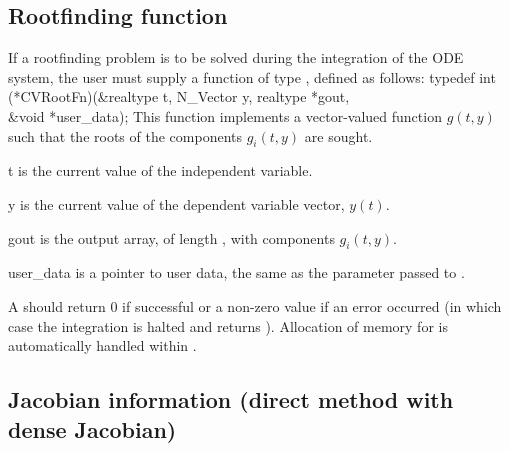 \subsection{Rootfinding function}\label{ss:rootFn}
If a rootfinding problem is to be solved during the integration of the ODE system,
the user must supply a {\CC} function of type , defined as follows:
{
  typedef int (*CVRootFn)(&realtype t, N\_Vector y, realtype *gout, \\
                          &void *user\_data);
}
{
  This function implements a vector-valued function $g(t,y)$ such that the roots of 
  the  components $g_i(t,y)$ are sought.
}
{
  \begin{args}
  \item[t]
    is the current value of the independent variable.
  \item[y]
    is the current value of the dependent variable vector, $y(t)$.
  \item[gout]
    is the output array, of length , with components $g_i(t,y)$.
  \item[user\_data]
    is a pointer to user data, the same as the       
    parameter passed to .   
  \end{args}
}
{
  A  should return 0 if successful or a non-zero value if
  an error occurred (in which case the integration is halted and  returns
  ).
}
{
  Allocation of memory for  is automatically handled within {\cvode}.
}


\subsection{Jacobian information (direct method with dense Jacobian)}
\label{ss:djacFn}

